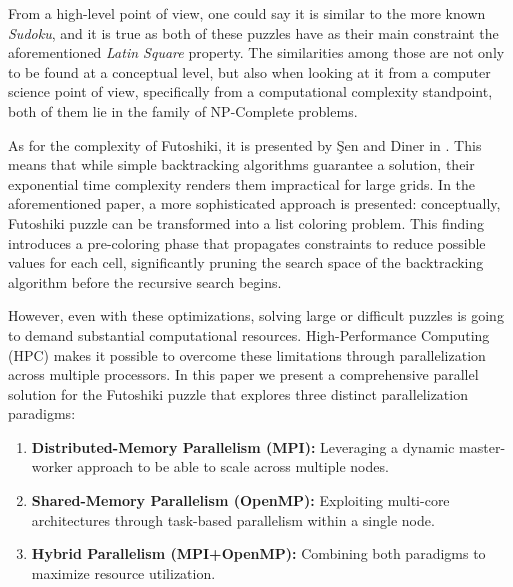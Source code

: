 From a high-level point of view, one could say it is similar to the more known \textit{Sudoku}, and it is true as both of these puzzles have as their main constraint the aforementioned \textit{Latin Square} property. The similarities among those are not only to be found at a conceptual level, but also when looking at it from a computer science point of view, specifically from a computational complexity standpoint, both of them lie in the family of NP-Complete problems. 

As for the complexity of Futoshiki, it is presented by Şen and Diner in \cite{Sen2024Futoshiki}. This means that while simple backtracking algorithms guarantee a solution, their exponential time complexity renders them impractical for large grids. In the aforementioned paper, a more sophisticated approach is presented: conceptually, Futoshiki puzzle can be transformed into a list coloring problem. This finding introduces a pre-coloring phase that propagates constraints to reduce possible values for each cell, significantly pruning the search space of the backtracking algorithm before the recursive search begins.


However, even with these optimizations, solving large or difficult puzzles is going to demand substantial computational resources. High-Performance Computing (HPC) makes it possible to overcome these limitations through parallelization across multiple processors. In this paper we present a comprehensive parallel solution for the Futoshiki puzzle that explores three distinct parallelization paradigms:

\begin{enumerate}
    \item \textbf{Distributed-Memory Parallelism (MPI):} \cite{MPIForum2021} Leveraging a dynamic master-worker approach to be able to scale across multiple nodes.
    \item \textbf{Shared-Memory Parallelism (OpenMP):} \cite{OpenMP2020} Exploiting multi-core architectures through task-based parallelism within a single node.
    \item \textbf{Hybrid Parallelism (MPI+OpenMP):} Combining both paradigms to maximize resource utilization.
\end{enumerate}

